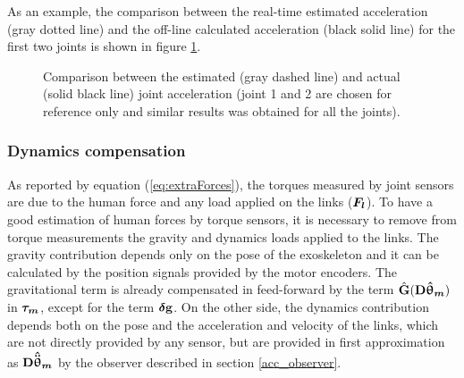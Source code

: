 As an example, the comparison between the real-time estimated acceleration (gray dotted line) and the off-line calculated acceleration (black solid line) for the first two joints is shown in figure \ref{fig:acceleration_validation}.
%
\begin{figure}[htb]
	\centering
	\def\svgwidth{1\columnwidth}
	\begin{footnotesize}
		
	\end{footnotesize}
	\caption{Comparison between the estimated (gray dashed line) and actual (solid black line) joint acceleration (joint 1 and 2 are chosen for reference only and similar results was obtained for all the joints). }
	\label{fig:acceleration_validation}
\end{figure}


\subsubsection{Dynamics compensation} \label{Dynamics compensation}

As reported by equation (\ref{eq:extraForces}), the torques measured by joint sensors are due to the human force and any load applied on the links (${ \boldsymbol {F_l}}$). To have a good estimation of human forces by torque sensors, it is necessary to remove from torque measurements the gravity and dynamics loads applied to the links. The gravity contribution  depends only on the pose of the exoskeleton and it can be calculated by the position signals provided by the motor encoders. The gravitational term is already compensated in feed-forward by the term $\hat{\mathbf{G}}(\mathbf{D}{ \boldsymbol {\hat{\uptheta}_m}})$ in ${ \boldsymbol {\tau_{m}}}$,
except for the term ${ \boldsymbol {\delta}} \mathbf{g}$.
On the other side, the dynamics contribution depends both on the pose and the acceleration and velocity of the links, which are not directly provided by any sensor, but are provided in first approximation as $\mathbf{D} { \boldsymbol {\hat{\ddot{\uptheta}}_m}}$  by the observer described in section \ref{acc_observer}.

